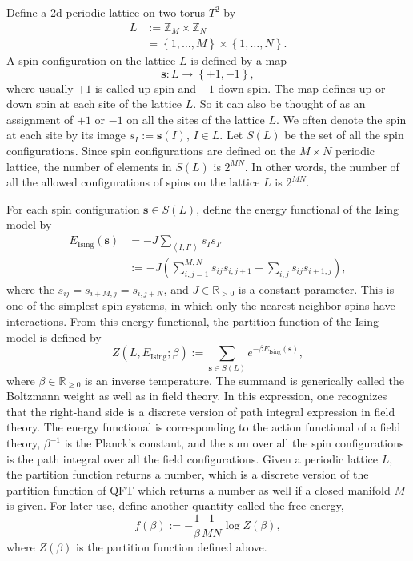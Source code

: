 Define a 2d periodic lattice on two-torus $T^{2}$ by 
\begin{align}
L 
  & :=  \mathbb{Z}_{M}\times\mathbb{Z}_{N}  \nonumber \\
  & =   \left\{ 1,\ldots,M\right\} \times\left\{ 1,\ldots,N\right\} .
\end{align}
 A spin configuration on the lattice $L$ is defined by a map
\begin{equation}
  \mathbf{s}  :  L  \longrightarrow  \left\{ +1,-1\right\} ,
\end{equation}
where usually $+1$ is called up spin and $-1$ down spin. The
map defines up or down spin at each site of the lattice $L$. So it
can also be thought of as an assignment of $+1$ or $-1$ on all the
sites of the lattice $L$. We often denote the spin at each site by
its image $s_{I} := \mathbf{s}\left(I\right),\,I\in L$. Let $S\left(L\right)$
be the set of all the spin configurations. Since spin configurations
are defined on the $M\times N$ periodic lattice, the number of elements
in $S\left(L\right)$ is $2^{MN}$. In other words, the number of
all the allowed configurations of spins on the lattice $L$ is $2^{MN}$.

For each spin configuration $\mathbf{s}\in S\left(L\right)$, define
the energy functional of the Ising model by
\begin{align}
  E_{\mathrm{Ising}}\left(\mathbf{s}\right) 
  & =   -J  \sum_{\left\langle I,I'\right\rangle } s_{I}s_{I'}  \nonumber \\
  & :=  -J  \left( \sum_{i,j=1}^{M,N}s_{ij}s_{i,j+1}+\sum_{i,j}s_{ij}s_{i+1,j} \right),
\end{align}
 where the $s_{ij}=s_{i+M,j}=s_{i,j+N}$, and $J\in\mathbb{R}_{>0}$
is a constant parameter. This is one of the simplest spin systems,
in which only the nearest neighbor spins have interactions. From this
energy functional, the partition function of the Ising model is defined
by 
\begin{equation}
  Z\left(L,E_{\mathrm{Ising}};\beta\right)  :=  \sum_{\mathbf{s}\in S\left(L\right)}  e^{-\beta E_{\mathrm{Ising}}\left(\mathbf{s}\right)},
\end{equation}
 where $\beta\in\mathbb{R}_{\geq0}$ is an inverse temperature. The
summand is generically called the Boltzmann weight as well as in field
theory. In this expression, one recognizes that the right-hand side
is a discrete version of path integral expression in field theory.
The energy functional is corresponding to the action functional of
a field theory, $\beta^{-1}$ is the Planck's constant, and the sum
over all the spin configurations is the path integral over all the
field configurations. Given a periodic lattice $L$, the partition
function returns a number, which is a discrete version of the partition
function of QFT which returns a number as well if a closed manifold
$M$ is given. For later use, define another quantity called the free
energy, 
\begin{equation}
  f\left(\beta\right)  :=  -\frac{1}{\beta}\frac{1}{MN}\log Z\left(\beta\right),
\end{equation}
 where $Z\left(\beta\right)$ is the partition function defined above. 

